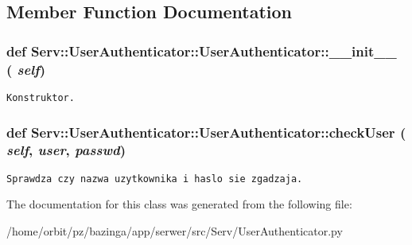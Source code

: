 \subsection{Member Function Documentation}
\hypertarget{class_serv_1_1_user_authenticator_1_1_user_authenticator_8da26a197368b560fc5b51a56cf95ccf}{
\subsubsection[{\_\-\_\-init\_\-\_\-}]{\setlength{\rightskip}{0pt plus 5cm}def Serv::UserAuthenticator::UserAuthenticator::\_\-\_\-init\_\-\_\- ( {\em self})}}
\label{class_serv_1_1_user_authenticator_1_1_user_authenticator_8da26a197368b560fc5b51a56cf95ccf}




\footnotesize\begin{verbatim}Konstruktor.\end{verbatim}
\normalsize
 \hypertarget{class_serv_1_1_user_authenticator_1_1_user_authenticator_df35019818eb86047a9c8d1d415bf3e5}{
\subsubsection[{checkUser}]{\setlength{\rightskip}{0pt plus 5cm}def Serv::UserAuthenticator::UserAuthenticator::checkUser ( {\em self}, \/   {\em user}, \/   {\em passwd})}}
\label{class_serv_1_1_user_authenticator_1_1_user_authenticator_df35019818eb86047a9c8d1d415bf3e5}




\footnotesize\begin{verbatim}Sprawdza czy nazwa uzytkownika i haslo sie zgadzaja.\end{verbatim}
\normalsize
 

The documentation for this class was generated from the following file:\begin{CompactItemize}
\item 
/home/orbit/pz/bazinga/app/serwer/src/Serv/UserAuthenticator.py\end{CompactItemize}
